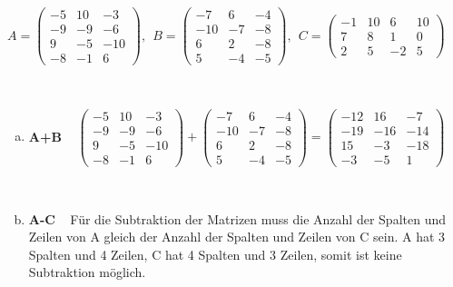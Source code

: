 \documentclass[10pt,ngerman]{scrartcl}
\begin{document}
\begin{enumerate}[1.]
	\begin{math}
	A = \begin{pmatrix}-5 & 10 & -3 \\ -9 & -9 & -6 \\ 9 & -5 & -10 \\ -8 & -1 & 6\end{pmatrix}, ~~
	B = \begin{pmatrix}-7 & 6 & -4 \\ -10 & -7 & -8 \\ 6 & 2 & -8 \\ 5 & -4 & -5\end{pmatrix}, ~~
	C = \begin{pmatrix}-1 & 10 & 6 & 10 \\ 7 & 8 & 1 & 0 \\ 2 & 5 & -2 & 5 \end{pmatrix}
	\end{math}
	
	 ~\newline~\newline
	 
	\begin{enumerate}[(a)]
	\item \textbf{A+B}\newline
	~\newline
	\begin{math}
	\begin{pmatrix}-5 & 10 & -3 \\ -9 & -9 & -6 \\ 9 & -5 & -10 \\ -8 & -1 & 6\end{pmatrix} + 
	\begin{pmatrix}-7 & 6 & -4 \\ -10 & -7 & -8 \\ 6 & 2 & -8 \\ 5 & -4 & -5\end{pmatrix} = 
	\begin{pmatrix}-12 & 16 & -7 \\ -19 & -16 & -14 \\ 15 & -3 & -18 \\ -3 & -5 & 1\end{pmatrix}
	\end{math}
	
	 ~\newline~\newline
	 
	\item \textbf{A-C}\newline
	~\newline
	Für die Subtraktion der Matrizen muss die Anzahl der Spalten und Zeilen von A gleich der Anzahl der Spalten und Zeilen von C sein. A hat 3 Spalten und 4 Zeilen, C hat 4 Spalten und 3 Zeilen, somit ist keine Subtraktion möglich.
	

\end{enumerate}
\end{enumerate}
\end{document}
